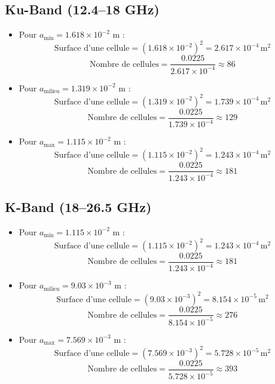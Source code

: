 \documentclass{article}
\begin{document}
\subsection{Ku-Band (12.4–18 GHz)}
\begin{itemize}
    \item Pour \( a_{\text{min}} = 1.618 \times 10^{-2} \) m :
    \[
    \text{Surface d'une cellule} = (1.618 \times 10^{-2})^2 = 2.617 \times 10^{-4} \, \text{m}^2
    \]
    \[
    \text{Nombre de cellules} = \frac{0.0225}{2.617 \times 10^{-4}} \approx 86
    \]

    \item Pour \( a_{\text{milieu}} = 1.319 \times 10^{-2} \) m :
    \[
    \text{Surface d'une cellule} = (1.319 \times 10^{-2})^2 = 1.739 \times 10^{-4} \, \text{m}^2
    \]
    \[
    \text{Nombre de cellules} = \frac{0.0225}{1.739 \times 10^{-4}} \approx 129
    \]

    \item Pour \( a_{\text{max}} = 1.115 \times 10^{-2} \) m :
    \[
    \text{Surface d'une cellule} = (1.115 \times 10^{-2})^2 = 1.243 \times 10^{-4} \, \text{m}^2
    \]
    \[
    \text{Nombre de cellules} = \frac{0.0225}{1.243 \times 10^{-4}} \approx 181
    \]
\end{itemize}

\subsection{K-Band (18–26.5 GHz)}
\begin{itemize}
    \item Pour \( a_{\text{min}} = 1.115 \times 10^{-2} \) m :
    \[
    \text{Surface d'une cellule} = (1.115 \times 10^{-2})^2 = 1.243 \times 10^{-4} \, \text{m}^2
    \]
    \[
    \text{Nombre de cellules} = \frac{0.0225}{1.243 \times 10^{-4}} \approx 181
    \]

    \item Pour \( a_{\text{milieu}} = 9.03 \times 10^{-3} \) m :
    \[
    \text{Surface d'une cellule} = (9.03 \times 10^{-3})^2 = 8.154 \times 10^{-5} \, \text{m}^2
    \]
    \[
    \text{Nombre de cellules} = \frac{0.0225}{8.154 \times 10^{-5}} \approx 276
    \]

    \item Pour \( a_{\text{max}} = 7.569 \times 10^{-3} \) m :
    \[
    \text{Surface d'une cellule} = (7.569 \times 10^{-3})^2 = 5.728 \times 10^{-5} \, \text{m}^2
    \]
    \[
    \text{Nombre de cellules} = \frac{0.0225}{5.728 \times 10^{-5}} \approx 393
    \]
\end{itemize}
\end{document}

